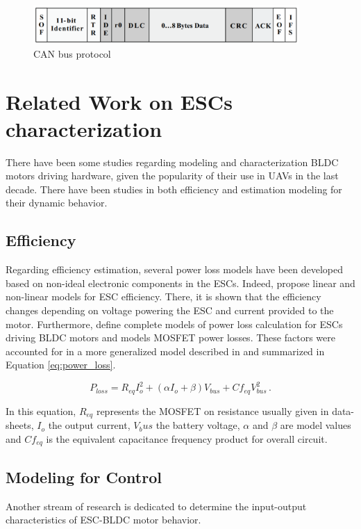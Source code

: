 \begin{figure}
    \centering
    \includegraphics[width=0.9\textwidth]{images/canbus_sketch.png}
    \caption{CAN bus protocol \cite{Corrigan2016}}
    \label{fig:canbus}
\end{figure}

\section{Related Work on ESCs characterization}

There have been some studies regarding modeling and characterization BLDC motors driving hardware, given the popularity of their use in UAVs in the last decade. There have been studies in both efficiency and estimation modeling for their dynamic behavior. 
\subsection{Efficiency}
Regarding efficiency estimation, several power loss models have been developed based on non-ideal electronic components in the ESCs. Indeed, \cite{Gong2017,Gong2018} propose linear and non-linear models for ESC efficiency. There, it is shown that the efficiency changes depending on voltage powering the ESC and current provided to the motor.  Furthermore, \cite{Millett2012, Keskar} define complete models of power loss calculation for ESCs driving BLDC motors and \cite{Graovac2006} models MOSFET power losses. These factors were accounted for in a more generalized model described in \cite{Tritium2013} and summarized in Equation \ref{eq:power_loss}.

\begin{equation}
  P_{loss}=R_{eq}I_o^2+(\alpha I_o+\beta)V_{bus}+Cf_{eq}V_{bus}^2\, .
    \label{eq:power_loss}
\end{equation}

In this equation, $R_{eq}$ represents the MOSFET on resistance usually given in data-sheets, $I_o$ the output current, $V_bus$ the battery voltage, $\alpha$ and $\beta$ are model values and $Cf_{eq}$ is the equivalent capacitance frequency product for overall circuit.

\subsection{Modeling for Control}
Another stream of research is dedicated to determine the input-output characteristics of ESC-BLDC motor behavior. 
\newline

